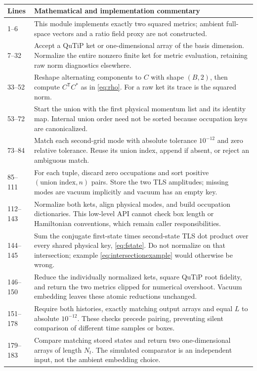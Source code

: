 \paragraph{}

\begin{longtable}{p{}p{}}
\toprule Lines & Mathematical and implementation commentary\\\midrule\endhead
1--6 & This module implements exactly two squared metrics; ambient full-space vectors and a ratio field proxy are not constructed.\\
7--32 & Accept a QuTiP ket or one-dimensional array of the basis dimension. Normalize the entire nonzero finite ket for metric evaluation, retaining raw norm diagnostics elsewhere.\\
33--52 & Reshape alternating components to $C$ with shape $(B,2)$, then compute $C^{\mathsf T}C^*$ as in \eqref{eq:rho}. For a raw ket its trace is the squared norm.\\
53--72 & Start the union with the first physical momentum list and its identity map. Internal union order need not be sorted because occupation keys are canonicalized.\\
73--84 & Match each second-grid mode with absolute tolerance $10^{-12}$ and zero relative tolerance. Reuse its union index, append if absent, or reject an ambiguous match.\\
85--111 & For each tuple, discard zero occupations and sort positive $(\text{union index},n)$ pairs. Store the two TLS amplitudes; missing modes are vacuum implicitly and vacuum has an empty key.\\
112--143 & Normalize both kets, align physical modes, and build occupation dictionaries. This low-level API cannot check box length or Hamiltonian conventions, which remain caller responsibilities.\\
144--145 & Sum the conjugate first-state times second-state TLS dot product over every shared physical key, \eqref{eq:fstate}. Do not normalize on that intersection; example \eqref{eq:intersectionexample} would otherwise be wrong.\\
146--150 & Reduce the individually normalized kets, square QuTiP root fidelity, and return the two metrics clipped for numerical overshoot. Vacuum embedding leaves these atomic reductions unchanged.\\
151--178 & Require both histories, exactly matching output arrays and equal $L$ to absolute $10^{-12}$. These checks precede pairing, preventing silent comparison of different time samples or boxes.\\
179--183 & Compare matching stored states and return two one-dimensional arrays of length $N_t$. The simulated comparator is an independent input, not the ambient embedding choice.\\
\bottomrule\end{longtable}
